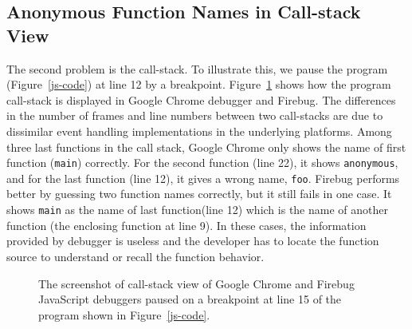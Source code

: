 \documentclass[10pt, preprint]{sigplanconf}
\begin{document}
\subsection{Anonymous Function Names in Call-stack View}
The second problem is the call-stack.
To illustrate this, we pause the program (Figure~\ref{js-code}) at line 12 by a breakpoint. Figure~\ref{debuggers-callstack} shows how the program call-stack is displayed in Google Chrome debugger and Firebug. The differences in the number of frames and line numbers between two call-stacks are due to dissimilar event handling implementations in the underlying platforms. Among three last functions in the call stack, Google Chrome only shows the name of first function (\verb|main|) correctly. For the second function (line 22), it shows \verb|anonymous|, and for the last function (line 12), it gives a wrong name, \verb|foo|. Firebug performs better by guessing two function names correctly, but it still fails in one case. It shows \verb|main| as the name of last function(line 12) which is the name of another function (the enclosing function at line 9). In these cases, the information provided by debugger is useless and the developer has to locate the function source to understand or recall the function behavior. 

\begin{figure}[htp]
\centerline{
\hfil
{}}
\caption{The screenshot of call-stack view of Google Chrome and Firebug JavaScript debuggers paused on a breakpoint at line 15 of the program shown in Figure~\ref{js-code}.}
\label{debuggers-callstack}
\end{figure}
 
\end{document}
